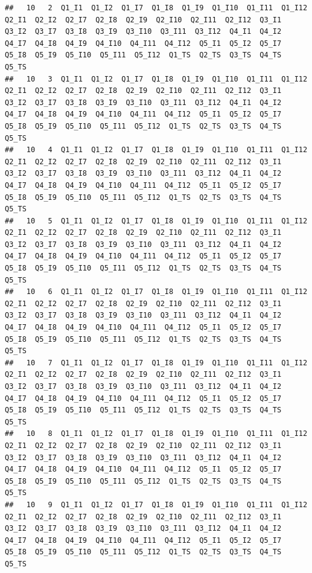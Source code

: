 \documentclass[
]{book}
\begin{document}
\begin{verbatim}
##   10   2  Q1_I1  Q1_I2  Q1_I7  Q1_I8  Q1_I9  Q1_I10  Q1_I11  Q1_I12  Q2_I1  Q2_I2  Q2_I7  Q2_I8  Q2_I9  Q2_I10  Q2_I11  Q2_I12  Q3_I1  Q3_I2  Q3_I7  Q3_I8  Q3_I9  Q3_I10  Q3_I11  Q3_I12  Q4_I1  Q4_I2  Q4_I7  Q4_I8  Q4_I9  Q4_I10  Q4_I11  Q4_I12  Q5_I1  Q5_I2  Q5_I7  Q5_I8  Q5_I9  Q5_I10  Q5_I11  Q5_I12  Q1_TS  Q2_TS  Q3_TS  Q4_TS  Q5_TS
##   10   3  Q1_I1  Q1_I2  Q1_I7  Q1_I8  Q1_I9  Q1_I10  Q1_I11  Q1_I12  Q2_I1  Q2_I2  Q2_I7  Q2_I8  Q2_I9  Q2_I10  Q2_I11  Q2_I12  Q3_I1  Q3_I2  Q3_I7  Q3_I8  Q3_I9  Q3_I10  Q3_I11  Q3_I12  Q4_I1  Q4_I2  Q4_I7  Q4_I8  Q4_I9  Q4_I10  Q4_I11  Q4_I12  Q5_I1  Q5_I2  Q5_I7  Q5_I8  Q5_I9  Q5_I10  Q5_I11  Q5_I12  Q1_TS  Q2_TS  Q3_TS  Q4_TS  Q5_TS
##   10   4  Q1_I1  Q1_I2  Q1_I7  Q1_I8  Q1_I9  Q1_I10  Q1_I11  Q1_I12  Q2_I1  Q2_I2  Q2_I7  Q2_I8  Q2_I9  Q2_I10  Q2_I11  Q2_I12  Q3_I1  Q3_I2  Q3_I7  Q3_I8  Q3_I9  Q3_I10  Q3_I11  Q3_I12  Q4_I1  Q4_I2  Q4_I7  Q4_I8  Q4_I9  Q4_I10  Q4_I11  Q4_I12  Q5_I1  Q5_I2  Q5_I7  Q5_I8  Q5_I9  Q5_I10  Q5_I11  Q5_I12  Q1_TS  Q2_TS  Q3_TS  Q4_TS  Q5_TS
##   10   5  Q1_I1  Q1_I2  Q1_I7  Q1_I8  Q1_I9  Q1_I10  Q1_I11  Q1_I12  Q2_I1  Q2_I2  Q2_I7  Q2_I8  Q2_I9  Q2_I10  Q2_I11  Q2_I12  Q3_I1  Q3_I2  Q3_I7  Q3_I8  Q3_I9  Q3_I10  Q3_I11  Q3_I12  Q4_I1  Q4_I2  Q4_I7  Q4_I8  Q4_I9  Q4_I10  Q4_I11  Q4_I12  Q5_I1  Q5_I2  Q5_I7  Q5_I8  Q5_I9  Q5_I10  Q5_I11  Q5_I12  Q1_TS  Q2_TS  Q3_TS  Q4_TS  Q5_TS
##   10   6  Q1_I1  Q1_I2  Q1_I7  Q1_I8  Q1_I9  Q1_I10  Q1_I11  Q1_I12  Q2_I1  Q2_I2  Q2_I7  Q2_I8  Q2_I9  Q2_I10  Q2_I11  Q2_I12  Q3_I1  Q3_I2  Q3_I7  Q3_I8  Q3_I9  Q3_I10  Q3_I11  Q3_I12  Q4_I1  Q4_I2  Q4_I7  Q4_I8  Q4_I9  Q4_I10  Q4_I11  Q4_I12  Q5_I1  Q5_I2  Q5_I7  Q5_I8  Q5_I9  Q5_I10  Q5_I11  Q5_I12  Q1_TS  Q2_TS  Q3_TS  Q4_TS  Q5_TS
##   10   7  Q1_I1  Q1_I2  Q1_I7  Q1_I8  Q1_I9  Q1_I10  Q1_I11  Q1_I12  Q2_I1  Q2_I2  Q2_I7  Q2_I8  Q2_I9  Q2_I10  Q2_I11  Q2_I12  Q3_I1  Q3_I2  Q3_I7  Q3_I8  Q3_I9  Q3_I10  Q3_I11  Q3_I12  Q4_I1  Q4_I2  Q4_I7  Q4_I8  Q4_I9  Q4_I10  Q4_I11  Q4_I12  Q5_I1  Q5_I2  Q5_I7  Q5_I8  Q5_I9  Q5_I10  Q5_I11  Q5_I12  Q1_TS  Q2_TS  Q3_TS  Q4_TS  Q5_TS
##   10   8  Q1_I1  Q1_I2  Q1_I7  Q1_I8  Q1_I9  Q1_I10  Q1_I11  Q1_I12  Q2_I1  Q2_I2  Q2_I7  Q2_I8  Q2_I9  Q2_I10  Q2_I11  Q2_I12  Q3_I1  Q3_I2  Q3_I7  Q3_I8  Q3_I9  Q3_I10  Q3_I11  Q3_I12  Q4_I1  Q4_I2  Q4_I7  Q4_I8  Q4_I9  Q4_I10  Q4_I11  Q4_I12  Q5_I1  Q5_I2  Q5_I7  Q5_I8  Q5_I9  Q5_I10  Q5_I11  Q5_I12  Q1_TS  Q2_TS  Q3_TS  Q4_TS  Q5_TS
##   10   9  Q1_I1  Q1_I2  Q1_I7  Q1_I8  Q1_I9  Q1_I10  Q1_I11  Q1_I12  Q2_I1  Q2_I2  Q2_I7  Q2_I8  Q2_I9  Q2_I10  Q2_I11  Q2_I12  Q3_I1  Q3_I2  Q3_I7  Q3_I8  Q3_I9  Q3_I10  Q3_I11  Q3_I12  Q4_I1  Q4_I2  Q4_I7  Q4_I8  Q4_I9  Q4_I10  Q4_I11  Q4_I12  Q5_I1  Q5_I2  Q5_I7  Q5_I8  Q5_I9  Q5_I10  Q5_I11  Q5_I12  Q1_TS  Q2_TS  Q3_TS  Q4_TS  Q5_TS

\end{verbatim}
\end{document}
